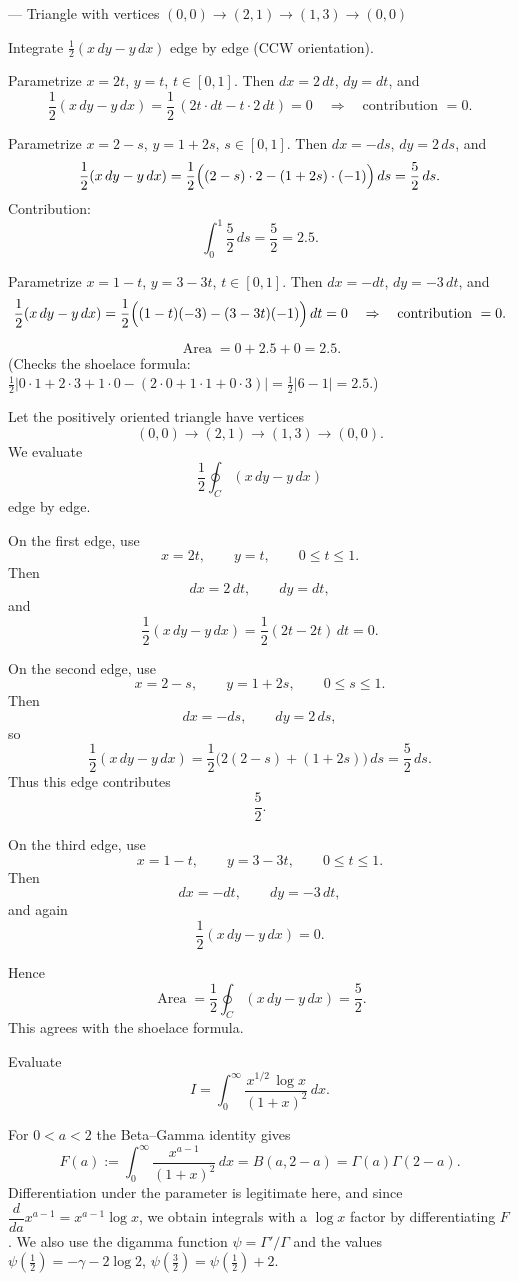 \begin{problem}[CP-IV-0046]
\label{prob:cp-iv-0046}
— Triangle with vertices \((0,0)\to(2,1)\to(1,3)\to(0,0)\)

Integrate \(\tfrac12(x\,dy-y\,dx)\) edge by edge (CCW orientation).

Parametrize \(x=2t\), \(y=t\), \(t\in[0,1]\). Then \(dx=2\,dt\), \(dy=dt\), and
\[
\frac12(x\,dy-y\,dx)
=
\frac12\,(2t\cdot dt - t\cdot 2\,dt)
=
0
\quad\Rightarrow\quad \text{contribution }=0.
\]

Parametrize \(x=2-s\), \(y=1+2s\), \(s\in[0,1]\). Then \(dx=-ds\), \(dy=2\,ds\), and
\[
\frac12(x\,dy-y\,dx)
=
\frac12\Bigl((2-s)\cdot 2 - (1+2s)\cdot(-1)\Bigr)\,ds
=
\frac{5}{2}\,ds.
\]
Contribution:
\[
\int_{0}^{1}\frac{5}{2}\,ds=\frac{5}{2}=2.5.
\]

Parametrize \(x=1-t\), \(y=3-3t\), \(t\in[0,1]\). Then \(dx=-dt\), \(dy=-3\,dt\), and
\[
\frac12(x\,dy-y\,dx)
=
\frac12\Bigl((1-t)(-3) - (3-3t)(-1)\Bigr)\,dt
=
0
\quad\Rightarrow\quad \text{contribution }=0.
\]

\[
\operatorname{Area}=0+2.5+0=\boxed{2.5}.
\]
(Checks the shoelace formula:
\(\displaystyle \tfrac12\bigl|0\cdot1+2\cdot3+1\cdot0-(2\cdot0+1\cdot1+0\cdot3)\bigr|
=\tfrac12|6-1|=2.5\).)
\end{problem}

\begin{solution}
Let the positively oriented triangle have vertices
\[
(0,0)\longrightarrow(2,1)\longrightarrow(1,3)\longrightarrow(0,0).
\]
We evaluate
\[
\frac12\oint_C(x\,dy-y\,dx)
\]
edge by edge.

On the first edge, use
\[
x=2t,\qquad y=t,\qquad 0\le t\le1.
\]
Then
\[
dx=2\,dt,\qquad dy=dt,
\]
and
\[
\frac12(x\,dy-y\,dx)
=
\frac12(2t-2t)\,dt
=
0.
\]

On the second edge, use
\[
x=2-s,\qquad y=1+2s,\qquad 0\le s\le1.
\]
Then
\[
dx=-ds,\qquad dy=2\,ds,
\]
so
\[
\frac12(x\,dy-y\,dx)
=
\frac12\bigl(2(2-s)+(1+2s)\bigr)\,ds
=
\frac52\,ds.
\]
Thus this edge contributes
\[
\frac52.
\]

On the third edge, use
\[
x=1-t,\qquad y=3-3t,\qquad 0\le t\le1.
\]
Then
\[
dx=-dt,\qquad dy=-3\,dt,
\]
and again
\[
\frac12(x\,dy-y\,dx)=0.
\]

Hence
\[
\boxed{
\operatorname{Area}
=
\frac12\oint_C(x\,dy-y\,dx)
=
\frac52.
}
\]
This agrees with the shoelace formula.
\end{solution}


\begin{problem}[CP-IV-0049]
\label{prob:cp-iv-0049}
Evaluate
\[
I=\int_{0}^{\infty}\frac{x^{1/2}\,\log x}{(1+x)^2}\,dx .
\]

\bigskip

For \(0<a<2\) the Beta–Gamma identity gives
\[
F(a):=\int_{0}^{\infty}\frac{x^{a-1}}{(1+x)^2}\,dx
=B(a,2-a)=\Gamma(a)\Gamma(2-a).
\]
Differentiation under the parameter is legitimate here, and since
\(\dfrac{d}{da}x^{a-1}=x^{a-1}\log x\), we obtain integrals with a \(\log x\) factor
by differentiating \(F\).
We also use the digamma function \(\psi=\Gamma'/\Gamma\) and the values
\(\psi(\tfrac12)=-\gamma-2\log2\), \(\psi(\tfrac32)=\psi(\tfrac12)+2\).

\bigskip
\end{problem}

